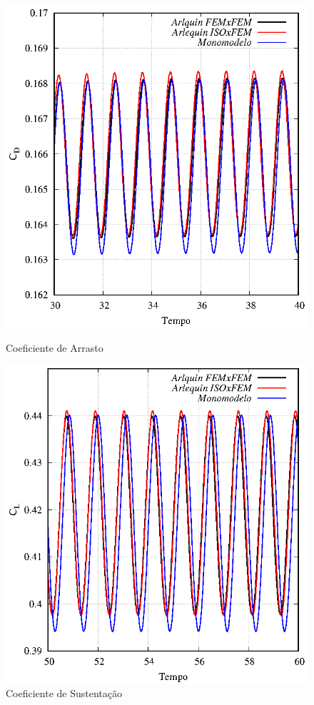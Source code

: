 \documentclass[tese_patricia]{subfiles}
\begin{document}
\begin{figure}[htb!]
	\centering 
	{\includegraphics[scale=1.0,trim=0cm 0cm 0cm 0cm, clip=true]{Imagens/Cap6/DragRe.eps}}	
	\caption{Coeficiente de Arrasto}
	\label{fig:AeroDrag}
\end{figure}



\begin{figure}[htb!]
	\centering 
	\includegraphics[scale=1.0,trim=0cm 0cm 0cm 0cm, clip=true]{Imagens/Cap6/LiftRe.eps}	
	\caption{Coeficiente de Sustentação}
	\label{fig:AeroLift}
\end{figure}
\end{document}
